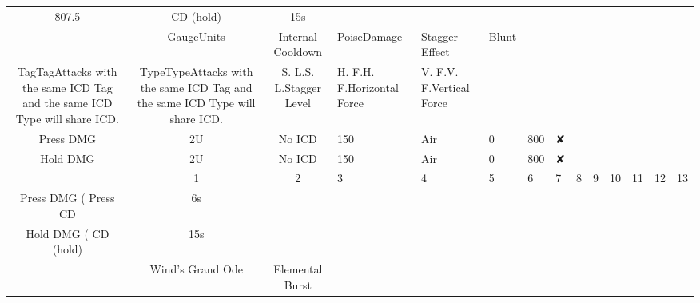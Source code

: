 \documentclass[a4paper,12pt]{article}
\begin{document}
\begin{tabular}{|c|c|c|}
807.5 & CD (hold) & 15s \\
 & GaugeUnits & Internal Cooldown & PoiseDamage & Stagger Effect & Blunt \\
TagTagAttacks with the same ICD Tag and the same ICD Type will share ICD. & TypeTypeAttacks with the same ICD Tag and the same ICD Type will share ICD. & S. L.S. L.Stagger Level & H. F.H. F.Horizontal Force & V. F.V. F.Vertical Force \\
Press DMG & 2U & No ICD & 150 & Air & 0 & 800 & ✘ \\
Hold DMG & 2U & No ICD & 150 & Air & 0 & 800 & ✘ \\
 & 1 & 2 & 3 & 4 & 5 & 6 & 7 & 8 & 9 & 10 & 11 & 12 & 13 \\
Press DMG (%
Press CD & 6s \\
Hold DMG (%
CD (hold) & 15s \\
 & Wind's Grand Ode & Elemental Burst \\

\end{tabular}
\end{document}
